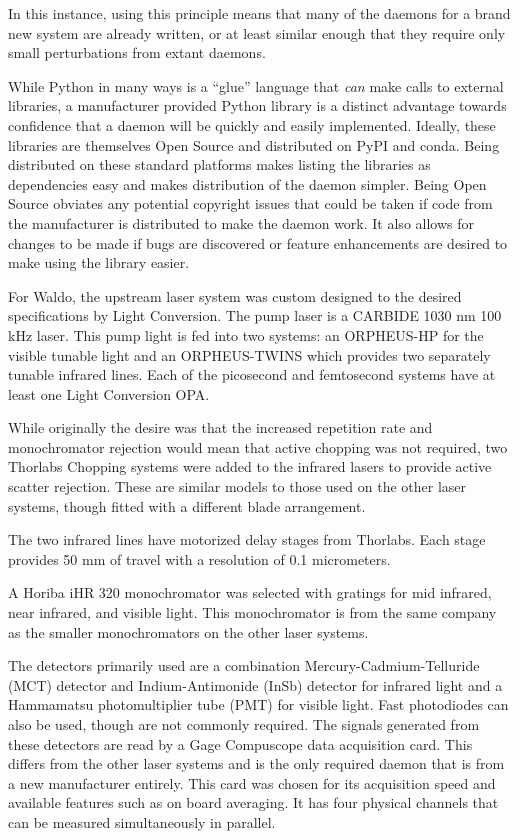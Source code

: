 In this instance, using this principle means that many of the \yaq{} daemons for a brand new system are already written, or at least similar enough that they require only small perturbations from extant daemons.

While Python in many ways is a ``glue'' language that \textit{can} make calls to external libraries, a manufacturer provided Python library is a distinct advantage towards confidence that a \yaq{} daemon will be quickly and easily implemented.
Ideally, these libraries are themselves Open Source and distributed on PyPI\cite{PyPI} and conda\cite{conda}.
Being distributed on these standard platforms makes listing the libraries as dependencies easy and makes distribution of the \yaq{} daemon simpler.
Being Open Source obviates any potential copyright issues that could be taken if code from the manufacturer is distributed to make the \yaq{} daemon work.
It also allows for changes to be made if bugs are discovered or feature enhancements are desired to make using the library easier.

For Waldo, the upstream laser system was custom designed to the desired specifications by Light Conversion.
The pump laser is a CARBIDE 1030 nm 100 kHz laser\cite{lightcon_carbide}.
This pump light is fed into two systems: an ORPHEUS-HP for the visible tunable light and an ORPHEUS-TWINS which provides two separately tunable infrared lines.
Each of the picosecond and femtosecond systems have at least one Light Conversion OPA.

While originally the desire was that the increased repetition rate and monochromator rejection would mean that active chopping was not required, two Thorlabs Chopping systems\cite{thorlabs_mc2000b} were added to the infrared lasers to provide active scatter rejection.
These are similar models to those used on the other laser systems, though fitted with a different blade arrangement.

The two infrared lines have motorized delay stages from Thorlabs\cite{thorlabs_lnr502e}.
Each stage provides 50 mm of travel with a resolution of 0.1 micrometers.

A Horiba iHR 320 monochromator\cite{horiba_ihr} was selected with gratings for mid infrared, near infrared, and visible light.
This monochromator is from the same company as the smaller monochromators on the other laser systems.

The detectors primarily used are a combination Mercury-Cadmium-Telluride (MCT) detector and Indium-Antimonide (InSb) detector for infrared light and a Hammamatsu photomultiplier tube (PMT) for visible light.
Fast photodiodes can also be used, though are not commonly required.
The signals generated from these detectors are read by a Gage Compuscope data acquisition card\cite{gage_octave}.
This differs from the other laser systems and is the only required daemon that is from a new manufacturer entirely.
This card was chosen for its acquisition speed and available features such as on board averaging.
It has four physical channels that can be measured simultaneously in parallel.


